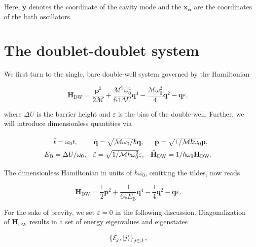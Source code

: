 \documentclass[preprint]{revtex4-2}
\begin{document}
Here, $\mathbf{y}$ denotes the coordinate of the cavity mode and the $\mathbf{x_\alpha}$ are the 
coordinates of the bath oscillators. 


\section{The doublet-doublet system}

We first turn to the single, bare double-well system governed by the Hamiltonian 

\begin{equation}
    \mathbf{H}_{\text{DW}} = \frac{\mathbf{p}^2}{2\mathcal{M}} + \frac{\mathcal{M}^2\omega_0^4}{64\Delta U}\mathbf{q}^4
    - \frac{\mathcal{M}\omega_0^2}{4}\mathbf{q}^2 - \mathbf{q}\varepsilon,
\end{equation}

where $\Delta U $ is the barrier height and $\varepsilon$ is the bias of the double-well.
Further, we will introduce dimensionless quantities via

\begin{equation}
\def\arraystretch{1.5}
\begin{array}{c c c}
    \tilde{t}=\omega_0t, 
    & \tilde{\mathbf{q}}=\sqrt{\mathcal{M}\omega_0/\hbar}\mathbf{q}, 
    & \tilde{\mathbf{p}}=\sqrt{1/\mathcal{M}\hbar\omega_0}\mathbf{p}, \\
    E_{\text{B}}=\Delta U/\omega_0,
    & \tilde{\varepsilon}=\sqrt{1/\mathcal{M}\hbar\omega_0^3}\varepsilon,
    & \tilde{\mathbf{H}}_{\text{DW}}=1/\hbar\omega_0\mathbf{H}_{\text{DW}}. \\
\end{array}
\end{equation}

The dimensionless Hamiltonian in units of $\hbar\omega_0$, omitting the tildes, now reads

\begin{equation}
    \mathbf{H}_{\text{DW}} = \frac{1}{2}\mathbf{p}^2+\frac{1}{64E_{\text{B}}}\mathbf{q}^4-\frac{1}{4}\mathbf{q}^2 -\mathbf{q}\varepsilon.
\end{equation}

For the sake of brevity, we set $\varepsilon=0$ in the following discussion.
Diagonalization of $\mathbf{H}_{\text{DW}}$ results in a set of energy eigenvalues and 
eigenstates 

\begin{equation}
    \left\{ \mathcal{E}_j, \ket{j} \right\}_{j\in J},
\end{equation}
\end{document}
